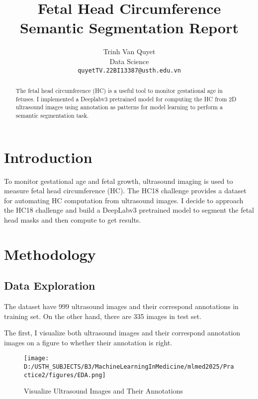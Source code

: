 \documentclass[10pt, conference]{IEEEtran}
\title{Fetal Head Circumference Semantic Segmentation Report}
\author{Trinh Van Quyet\\ Data Science\\ \texttt{quyetTV.22BI13387@usth.edu.vn}}
\begin{document}
	\maketitle
	
	\begin{abstract}
		The fetal head circumference (HC) is a useful tool to monitor gestational age in fetuses. I implemented a Deeplabv3 pretrained model for computing the HC from 2D ultrasound images using annotation as patterns for model learning to perform a semantic segmentation task.
	\end{abstract}
	
	
	\section{Introduction}
	To monitor gestational age and fetal growth, ultrasound imaging is used to measure fetal head circumference (HC). The HC18 challenge provides a dataset for automating HC computation from ultrasound images. I decide to approach the HC18 challenge and build a DeepLabv3 pretrained model to segment the fetal head masks and then compute to get results.
	
	\section{Methodology}
	\subsection{Data Exploration}
	The dataset have 999 ultrasound images and their correspond annotations in training set. On the other hand, there are 335 images in test set.
	
	The first, I visualize both ultrasound images and their correspond annotation images on a figure to whether their annotation is right.
	
	\begin{figure}[H]
		\centering
		\texttt{[image: D:/USTH\_SUBJECTS/B3/MachineLearningInMedicine/mlmed2025/Practice2/figures/EDA.png]}
		\caption{Visualize Ultrasound Images and Their Annotations}
		\label{fig:visualize}
	\end{figure}
	
\end{document}
